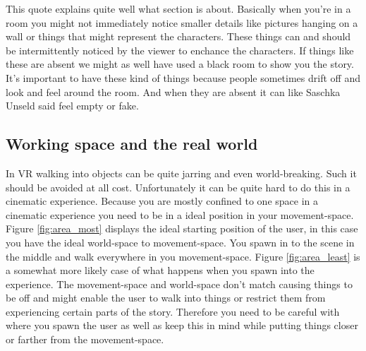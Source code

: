 \documentclass{report}
\begin{document}
				This quote explains quite well what section is about. Basically when you're in a room you might not immediately notice smaller details like pictures hanging on a wall or things that might represent the characters. These things can and should be intermittently noticed by the viewer to enchance the characters. If things like these are absent we might as well have used a black room to show you the story. 				
				It's important to have these kind of things because people sometimes drift off and look and feel around the room. And when they are absent it can like Saschka Unseld said feel empty or fake.
				
				\subsection{Working space and the real world}
				In VR walking into objects can be quite jarring and even world-breaking. Such it should be avoided at all cost. Unfortunately it can be quite hard to do this in a cinematic experience. Because you are mostly confined to one space in a cinematic experience you need to be in a ideal position in your movement-space. 
				Figure \ref{fig:area_most} displays the ideal starting position of the user, in this case you have the ideal world-space to movement-space. You spawn in to the scene in the middle and walk everywhere in you movement-space. Figure \ref{fig:area_least} is a somewhat more likely case of what happens when you spawn into the experience. The movement-space and world-space don't match causing things to be off and might enable the user to walk into things or restrict them from experiencing certain parts of the story. Therefore you need to be careful with where you spawn the user as well as keep this in mind while putting things closer or farther from the movement-space.
				
\end{document}
